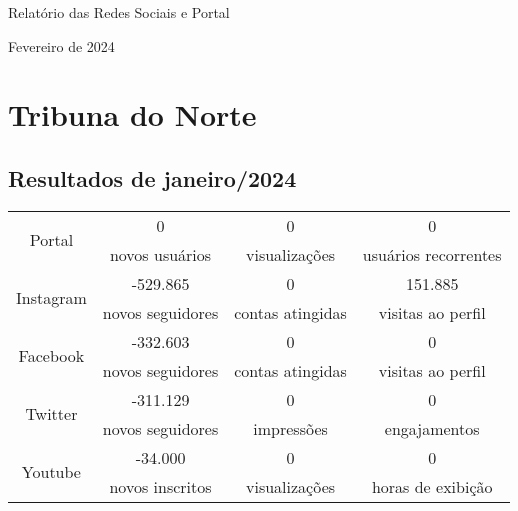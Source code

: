 \documentclass{article}%
\begin{document}
%
\normalsize%
\begin{minipage}{\textwidth}%
\centering%
\begin{Large}%
Relatório das Redes Sociais e Portal%
\end{Large}%
\linebreak%
\linebreak%
\linebreak%
\begin{large}%
Fevereiro de 2024%
\end{large}%
\linebreak%
\end{minipage}%
\section*{Tribuna do Norte}%
\label{sec:TribunadoNorte}%
\subsection*{Resultados de janeiro/2024}%
\label{subsec:Resultadosdejaneiro/2024}%
\begin{minipage}{\textwidth}%
\centering%
\begin{tabular}{@{}|c|c|c|c|@{}}%
\toprule%
\multirow{2}{*}{Portal}&0&0&0\\%
&novos usuários&visualizações&usuários recorrentes\\%
\midrule%
\multirow{2}{*}{Instagram}&{-}529.865&0&151.885\\%
&novos seguidores&contas atingidas&visitas ao perfil\\%
\midrule%
\multirow{2}{*}{Facebook}&{-}332.603&0&0\\%
&novos seguidores&contas atingidas&visitas ao perfil\\%
\midrule%
\multirow{2}{*}{Twitter}&{-}311.129&0&0\\%
&novos seguidores&impressões&engajamentos\\%
\midrule%
\multirow{2}{*}{Youtube}&{-}34.000&0&0\\%
&novos inscritos&visualizações&horas de exibição\\\bottomrule%
%
\end{tabular}%
\end{minipage}%
\end{document}
